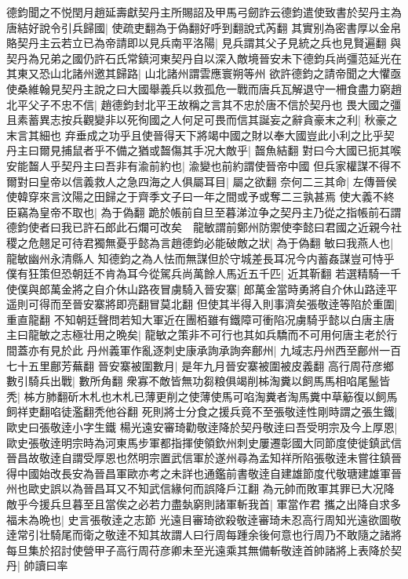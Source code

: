德鈞聞之不悦閏月趙延壽獻契丹主所賜詔及甲馬弓劒詐云德鈞遣使致書於契丹主為唐結好說令引兵歸國|{
	使疏吏翻為于偽翻好呼到翻說式芮翻}
其實别為密書厚以金帛賂契丹主云若立已為帝請即以見兵南平洛陽|{
	見兵謂其父子見統之兵也見賢遍翻}
與契丹為兄弟之國仍許石氏常鎮河東契丹自以深入敵境晉安未下德鈞兵尚彊范延光在其東又恐山北諸州邀其歸路|{
	山北諸州謂雲應寰朔等州}
欲許德鈞之請帝聞之大懼亟使桑維翰見契丹主說之曰大國舉義兵以救孤危一戰而唐兵瓦解退守一柵食盡力窮趙北平父子不忠不信|{
	趙德鈞封北平王故稱之言其不忠於唐不信於契丹也}
畏大國之彊且素蓄異志按兵觀變非以死徇國之人何足可畏而信其誕妄之辭貪豪末之利|{
	秋豪之末言其細也}
弃垂成之功乎且使晉得天下將竭中國之財以奉大國豈此小利之比乎契丹主曰爾見捕鼠者乎不備之猶或齧傷其手况大敵乎|{
	齧魚結翻}
對曰今大國已扼其喉安能齧人乎契丹主曰吾非有渝前約也|{
	渝變也前約謂使晉帝中國}
但兵家權謀不得不爾對曰皇帝以信義救人之急四海之人俱屬耳目|{
	屬之欲翻}
奈何二三其命|{
	左傳晉侯使韓穿來言汶陽之田歸之于齊季文子曰一年之間或予或奪二三孰甚焉}
使大義不終臣竊為皇帝不取也|{
	為于偽翻}
跪於帳前自旦至暮涕泣争之契丹主乃從之指帳前石謂德鈞使者曰我已許石郎此石爛可改矣　龍敏謂前鄭州防禦使李懿曰君國之近親今社稷之危翹足可待君獨無憂乎懿為言趙德鈞必能破敵之狀|{
	為于偽翻}
敏曰我燕人也|{
	龍敏幽州永清縣人}
知德鈞之為人怯而無謀但於守城差長耳况今内蓄姦謀豈可恃乎僕有狂策但恐朝廷不肯為耳今從駕兵尚萬餘人馬近五千匹|{
	近其靳翻}
若選精騎一千使僕與郎萬金將之自介休山路夜冒虜騎入晉安寨|{
	郎萬金當時勇將自介休山路逹平遥則可得而至晉安寨將即亮翻冒莫北翻}
但使其半得入則事濟矣張敬逹等陷於重圍|{
	重直龍翻}
不知朝廷聲問若知大軍近在團栢雖有鐵障可衝陷况虜騎乎懿以白唐主唐主曰龍敏之志極壮用之晩矣|{
	龍敏之策非不可行也其如兵驕而不可用何唐主老於行間蓋亦有見於此}
丹州義軍作亂逐刺史康承詢承詢奔鄜州|{
	九域志丹州西至鄜州一百七十五里鄜芳蕪翻}
晉安寨被圍數月|{
	是年九月晉安寨被圍被皮義翻}
高行周苻彦鄉數引騎兵出戰|{
	數所角翻}
衆寡不敵皆無功芻粮俱竭削柹淘糞以飼馬馬相啗尾鬛皆秃|{
	柹方肺翻斫木札也木札已薄更削之使薄使馬可啗淘糞者淘馬糞中草䈥復以飼馬飼祥吏翻啗徒濫翻秃他谷翻}
死則將士分食之援兵竟不至張敬逹性剛時謂之張生鐵|{
	歐史曰張敬逹小字生鐵}
楊光遠安審琦勸敬逹降於契丹敬逹曰吾受明宗及今上厚恩|{
	歐史張敬逹明宗時為河東馬步軍都指揮使領欽州刺史屢遷彰國大同節度使徙鎮武信晉昌故敬逹自謂受厚恩也然明宗置武信軍於遂州尋為孟知祥所陷張敬逹未嘗往鎮晉得中國始改長安為晉昌軍歐亦考之未詳也通鑑前書敬逹自建雄節度代敬瑭建雄軍晉州也歐史誤以為晉昌耳又不知武信緣何而誤降戶江翻}
為元帥而敗軍其罪已大况降敵乎今援兵旦暮至且當俟之必若力盡埶窮則諸軍斬我首|{
	軍當作君}
攜之出降自求多福未為晩也|{
	史言張敬逹之志節}
光遠目審琦欲殺敬逹審琦未忍高行周知光遠欲圖敬逹常引壮騎尾而衛之敬逹不知其故謂人曰行周每踵余後何意也行周乃不敢隨之諸將每旦集於招討使營甲子高行周苻彦卿未至光遠乘其無備斬敬逹首帥諸將上表降於契丹|{
	帥讀曰率}
